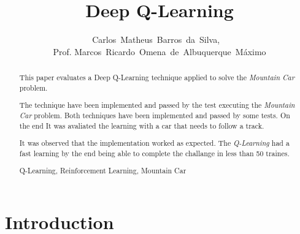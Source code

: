 \documentclass[journal]{IEEEtran}
\begin{document}
    \title{Deep Q-Learning}
  \author{Carlos~Matheus~Barros~da~Silva,
  ~
  \\Prof. Marcos~Ricardo~Omena~de~Albuquerque~Máximo}


\maketitle


\begin{abstract}

This paper evaluates a Deep Q-Learning technique applied to solve the \textit{Mountain Car} problem.

The technique have been implemented and passed by the test executing the \textit{Mountain Car} problem.
Both techniques have been implemented and passed by some tests. On the end It was avaliated the learning with a car that needs to follow a track.

It was observed that the implementation worked as expected. The \textit{Q-Learning} had a fast learning by the end being able to complete the challange in less than 50 traines.

\begin{IEEEkeywords}
    Q-Learning, Reinforcement Learning, Mountain Car
\end{IEEEkeywords}
\end{abstract}

\IEEEpeerreviewmaketitle



\section{Introduction}
\end{document}
